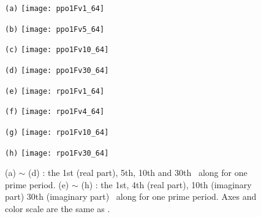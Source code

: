 \begin{figure}[h]
  \centering
  \begin{minipage}{.115\textwidth}
    \centering \small{\texttt{(a)}}
    \texttt{[image: ppo1Fv1\_64]}
  \end{minipage}
  \begin{minipage}{.115\textwidth}
    \centering \small{\texttt{(b)}}
    \texttt{[image: ppo1Fv5\_64]}
  \end{minipage}
  \begin{minipage}{.115\textwidth}
    \centering \small{\texttt{(c)}}
    \texttt{[image: ppo1Fv10\_64]}
  \end{minipage}
  \begin{minipage}{.115\textwidth}
    \centering \small{\texttt{(d)}}
    \texttt{[image: ppo1Fv30\_64]}
  \end{minipage}
  \begin{minipage}{.115\textwidth}
    \centering \small{\texttt{(e)}}
    \texttt{[image: rpo1Fv1\_64]}
  \end{minipage}
  \begin{minipage}{.115\textwidth}
    \centering \small{\texttt{(f)}}
    \texttt{[image: rpo1Fv4\_64]}
  \end{minipage}
  \begin{minipage}{.115\textwidth}
    \centering \small{\texttt{(g)}}
    \texttt{[image: rpo1Fv10\_64]}
  \end{minipage}
  \begin{minipage}{.115\textwidth}
    \centering \small{\texttt{(h)}}
    \texttt{[image: rpo1Fv30\_64]}
  \end{minipage}%
  \caption[\Fv s of  and  for one prime period.]{
    (a) $\sim$ (d) : the 1st (real part), 5th, 10th and 30th \Fv\ along
     for one prime period.
    (e) $\sim$ (h) : the 1st, 4th (real part), 10th (imaginary part) 30th (imaginary part)
    \Fv\ along  for one prime period.
    Axes and color scale are the same as .
  }
  \label{fig:Fvs}
\end{figure}
